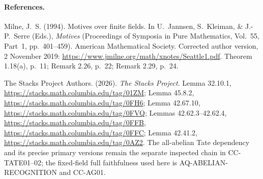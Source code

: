 \paragraph{References.}
Milne, J.~S. (1994). Motives over finite fields. In U.~Jannsen,
S.~Kleiman, \& J.-P.~Serre (Eds.), \emph{Motives}
(Proceedings of Symposia in Pure Mathematics, Vol.~55, Part~1,
pp.~401--459). American Mathematical Society.
Corrected author version, 2 November 2019:
\url{https://www.jmilne.org/math/xnotes/Seattle1.pdf}.
Theorem 1.18(a), p.~11; Remark 2.26, p.~22; Remark 2.29, p.~24.

The Stacks Project Authors. (2026). \emph{The Stacks Project}.
Lemma 32.10.1, \url{https://stacks.math.columbia.edu/tag/01ZM};
Lemma 45.8.2, \url{https://stacks.math.columbia.edu/tag/0FH6};
Lemma 42.67.10, \url{https://stacks.math.columbia.edu/tag/0FVQ};
Lemmas 42.62.3--42.62.4,
\url{https://stacks.math.columbia.edu/tag/0FFB},
\url{https://stacks.math.columbia.edu/tag/0FFC};
Lemma 42.41.2, \url{https://stacks.math.columbia.edu/tag/0AZ2}.
The all-abelian Tate dependency and its precise primary versions
remain the separate inspected chain in CC-TATE01--02;
the fixed-field full faithfulness used here is AQ-ABELIAN-RECOGNITION
and CC-AG01.
